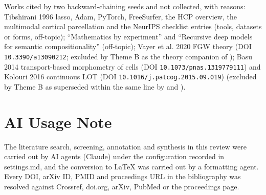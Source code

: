 \documentclass[journal,onecolumn]{IEEEtran}
\begin{document}
Works cited by two backward-chaining seeds and not collected, with reasons: Tibshirani 1996 lasso, Adam, PyTorch, FreeSurfer, the HCP overview, the multimodal cortical parcellation and the NeurIPS checklist entries (tools, datasets or forms, off-topic); ``Mathematics by experiment'' and ``Recursive deep models for semantic compositionality'' (off-topic); Vayer et al. 2020 FGW theory (DOI \nolinkurl{10.3390/a13090212}; excluded by Theme B as the theory companion of \cite{Vayer2019Structured}); Basu 2014 transport-based morphometry of cells (DOI \nolinkurl{10.1073/pnas.1319779111}) and Kolouri 2016 continuous LOT (DOI \nolinkurl{10.1016/j.patcog.2015.09.019}) (excluded by Theme B as superseded within the same line by \cite{Wang2013Linear} and \cite{Kundu2018Discovery}).

\section*{AI Usage Note}

The literature search, screening, annotation and synthesis in this review were carried out by AI agents (Claude) under the configuration recorded in settings.md, and the conversion to LaTeX was carried out by a formatting agent. Every DOI, arXiv ID, PMID and proceedings URL in the bibliography was resolved against Crossref, doi.org, arXiv, PubMed or the proceedings page.



\end{document}
